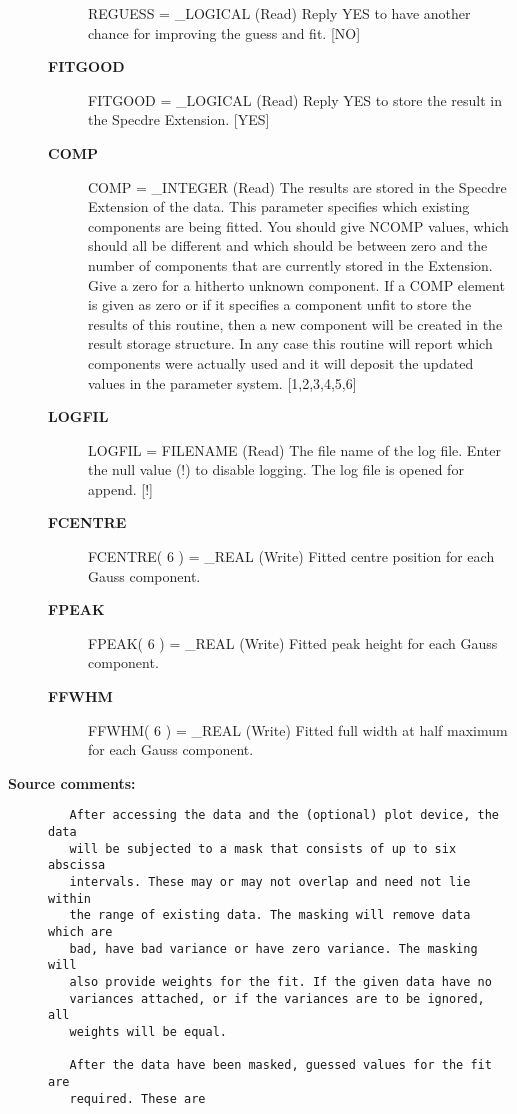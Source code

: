 \begin{description}
\begin{description}
REGUESS = _LOGICAL (Read)
   Reply YES to have another chance for improving the guess and
   fit. [NO]
\item [{\bf FITGOOD}]
FITGOOD = _LOGICAL (Read)
   Reply YES to store the result in the Specdre Extension. [YES]
\item [{\bf COMP}]
COMP = _INTEGER (Read)
   The results are stored in the Specdre Extension of the data.
   This parameter specifies which existing components are being
   fitted. You should give NCOMP values, which should all be
   different and which should be between zero and the number of
   components that are currently stored in the Extension. Give a
   zero for a hitherto unknown component. If a COMP element is
   given as zero or if it specifies a component unfit to store the
   results of this routine, then a new component will be created
   in the result storage structure. In any case this routine will
   report which components were actually used and it will deposit
   the updated values in the parameter system. [1,2,3,4,5,6]
\item [{\bf LOGFIL}]
LOGFIL = FILENAME (Read)
   The file name of the log file. Enter the null value (!) to
   disable logging. The log file is opened for append. [!]
\item [{\bf FCENTRE}]
FCENTRE( 6 ) = _REAL (Write)
   Fitted centre position for each Gauss component.
\item [{\bf FPEAK}]
FPEAK( 6 ) = _REAL (Write)
   Fitted peak height for each Gauss component.
\item [{\bf FFWHM}]
FFWHM( 6 ) = _REAL (Write)
   Fitted full width at half maximum for each Gauss component.

\end{description}

\item [{\bf Source comments:}]
\begin{verbatim}
   After accessing the data and the (optional) plot device, the data
   will be subjected to a mask that consists of up to six abscissa
   intervals. These may or may not overlap and need not lie within
   the range of existing data. The masking will remove data which are
   bad, have bad variance or have zero variance. The masking will
   also provide weights for the fit. If the given data have no
   variances attached, or if the variances are to be ignored, all
   weights will be equal.

   After the data have been masked, guessed values for the fit are
   required. These are


\end{verbatim}
\end{description}
